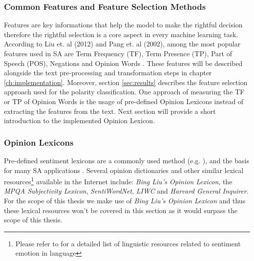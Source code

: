 \documentclass[
	a4paper,
	pdftex,
	12pt,	
	footinclude=true,
	fleqn,
	final,
	]{report}%
\begin{document}
\subsubsection*{Common Features and Feature Selection Methods} 
\vspace{-0.3cm}
Features are key informations that help the model to make the 
rightful decision therefore the rightful selection
is a core aspect in every machine learning task. 
According to Liu et. al (2012) and Pang et. al (2002), 
among the most popular features used in SA are Term Frequency (TF), 
Term Presence (TP), Part of Speech (POS), Negations and Opinion 
Words \cite{Pang2002,Liu2012a}. These features will be described 
alongside the text pre-processing and transformation steps in 
chapter \ref{ch:implementation}. Moreover, section \ref{sec:results} describes 
the feature selection approach used for the polarity classification. One approach 
of measuring the TF or TP of Opinion Words is the usage of pre-defined Opinion Lexicons
instead of extracting the features from the text. Next section will provide a short
introduction to the implemented Opinion Lexicon.
\vspace{-0.45cm}
\subsubsection*{Opinion Lexicons} 
\label{sec:resources}
\vspace{-0.3cm}
Pre-defined sentiment lexicons are a commonly used method
(e.g. \cite{Liu2004,Turney2002,Adamopoulos2013,Fang2015}), and the basis for many SA 
applications \cite{Potts2011}. Several opinion dictionaries and other similar 
lexical resources\footnote{Please refer to \cite{Strapparava2015,Potts2011} for a detailed
list of linguistic resources related to sentiment emotion in language} available in the Internet
include: \emph{Bing Liu's Opinion Lexicon}, the \emph{MPQA Subjectivity Lexicon}, \emph{SentiWordNet},
\emph{LIWC} and \emph{Harvard General Inquirer}. For the scope of this thesis we make use of \emph{Bing Liu's Opinion Lexicon} \cite{Liu2004}
and thus these lexical resources won't be covered in this section as it would surpass the scope of this thesis.
\end{document}
